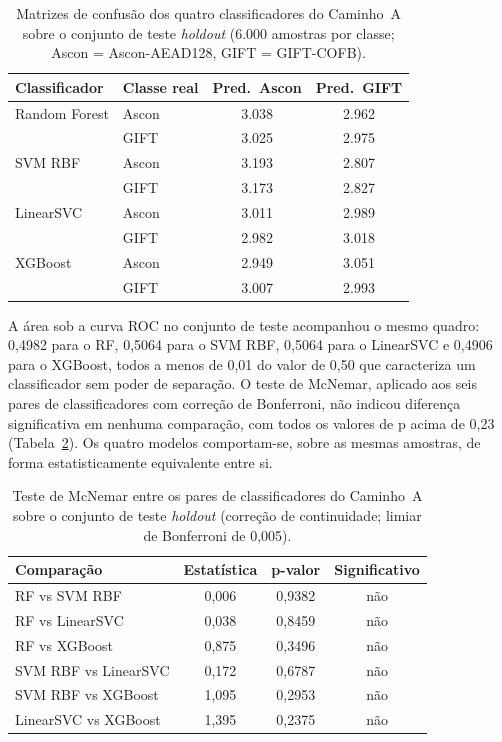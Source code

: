 \begin{table}[htb]
\centering
\caption{Matrizes de confusão dos quatro classificadores do Caminho~A sobre o conjunto de teste \textit{holdout} (6.000 amostras por classe; Ascon = Ascon-AEAD128, GIFT = GIFT-COFB).}
\label{tab:res-a-confusao}
\begin{tabular}{llcc}
\toprule
Classificador & Classe real & Pred.\ Ascon & Pred.\ GIFT \\
\midrule
Random Forest & Ascon & 3.038 & 2.962 \\
              & GIFT  & 3.025 & 2.975 \\
\midrule
SVM RBF       & Ascon & 3.193 & 2.807 \\
              & GIFT  & 3.173 & 2.827 \\
\midrule
LinearSVC     & Ascon & 3.011 & 2.989 \\
              & GIFT  & 2.982 & 3.018 \\
\midrule
XGBoost       & Ascon & 2.949 & 3.051 \\
              & GIFT  & 3.007 & 2.993 \\
\bottomrule
\end{tabular}
\end{table}

A área sob a curva ROC no conjunto de teste acompanhou o mesmo quadro: 0,4982 para o RF, 0,5064 para o SVM RBF, 0,5064 para o LinearSVC e 0,4906 para o XGBoost, todos a menos de 0,01 do valor de 0,50 que caracteriza um classificador sem poder de separação. O teste de McNemar, aplicado aos seis pares de classificadores com correção de Bonferroni, não indicou diferença significativa em nenhuma comparação, com todos os valores de p acima de 0,23 (Tabela~\ref{tab:res-a-mcnemar}). Os quatro modelos comportam-se, sobre as mesmas amostras, de forma estatisticamente equivalente entre si.

\begin{table}[htb]
\centering
\caption{Teste de McNemar entre os pares de classificadores do Caminho~A sobre o conjunto de teste \textit{holdout} (correção de continuidade; limiar de Bonferroni de 0,005).}
\label{tab:res-a-mcnemar}
\begin{tabular}{lccc}
\toprule
Comparação & Estatística & p-valor & Significativo \\
\midrule
RF vs SVM RBF          & 0,006 & 0,9382 & não \\
RF vs LinearSVC        & 0,038 & 0,8459 & não \\
RF vs XGBoost          & 0,875 & 0,3496 & não \\
SVM RBF vs LinearSVC   & 0,172 & 0,6787 & não \\
SVM RBF vs XGBoost     & 1,095 & 0,2953 & não \\
LinearSVC vs XGBoost   & 1,395 & 0,2375 & não \\
\bottomrule
\end{tabular}
\end{table}

